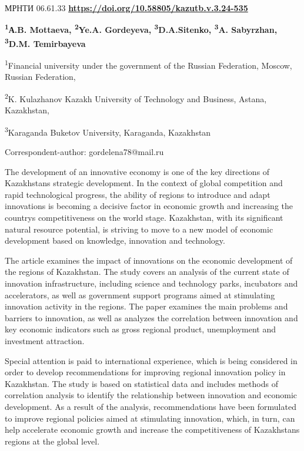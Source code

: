 \newpage
МРНТИ 06.61.33
\hfill {\bfseries \href{https://doi.org/10.58805/kazutb.v.3.24-535}{https://doi.org/10.58805/kazutb.v.3.24-535}}


\begin{center}
{\bfseries \textsuperscript{1}А.B. Mottaeva, \textsuperscript{2}Ye.A. Gordeyeva\envelope, \textsuperscript{3}D.A.Sitenko, \textsuperscript{3}A. Sabyrzhan, \textsuperscript{3}D.M. Temirbayeva}

\textsuperscript{1}Financial university under the government of the
Russian Federation, Moscow, Russian Federation,

\textsuperscript{2}K. Kulazhanov Kazakh University of Technology and
Business, Astana, Kazakhstan,

\textsuperscript{3}Karaganda Buketov University, Karaganda, Kazakhstan
\end{center}

\envelope Correspondent-author: gordelena78@mail.ru

The development of an innovative economy is one of the key directions of
Kazakhstan\textquotesingle s strategic development. In the context of
global competition and rapid technological progress, the ability of
regions to introduce and adapt innovations is becoming a decisive factor
in economic growth and increasing the country\textquotesingle s
competitiveness on the world stage. Kazakhstan, with its significant
natural resource potential, is striving to move to a new model of
economic development based on knowledge, innovation and technology.

The article examines the impact of innovations on the economic
development of the regions of Kazakhstan. The study covers an analysis
of the current state of innovation infrastructure, including science and
technology parks, incubators and accelerators, as well as government
support programs aimed at stimulating innovation activity in the
regions. The paper examines the main problems and barriers to
innovation, as well as analyzes the correlation between innovation and
key economic indicators such as gross regional product, unemployment and
investment attraction.

Special attention is paid to international experience, which is being
considered in order to develop recommendations for improving regional
innovation policy in Kazakhstan. The study is based on statistical data
and includes methods of correlation analysis to identify the
relationship between innovation and economic development. As a result of
the analysis, recommendations have been formulated to improve regional
policies aimed at stimulating innovation, which, in turn, can help
accelerate economic growth and increase the competitiveness of
Kazakhstan\textquotesingle s regions at the global level.

